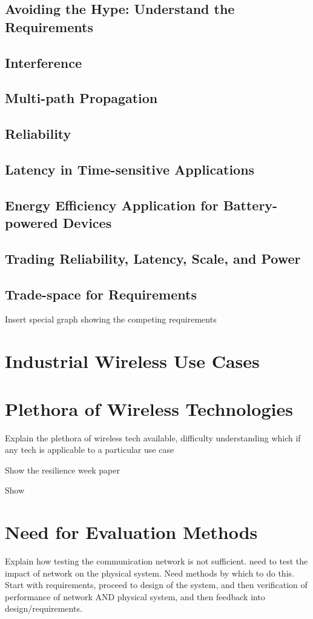 \documentclass[english]{spimubphdthesis}
\begin{document}
\subsection{Avoiding the Hype: Understand the Requirements}
\subsection{Interference}
\subsection{Multi-path Propagation}
\subsection{Reliability}
\subsection{Latency in Time-sensitive Applications}
\subsection{Energy Efficiency Application for Battery-powered Devices }
\subsection{Trading Reliability, Latency, Scale, and Power}

\subsection{Trade-space for Requirements}
Insert special graph showing the competing requirements

\section{Industrial Wireless Use Cases}

\section{Plethora of Wireless Technologies}
Explain the plethora of wireless tech available, difficulty understanding which if any tech is applicable to a particular use case

Show the resilience week paper

Show 

\section{Need for Evaluation Methods }
Explain how testing the communication network is not sufficient.  need to test the impact of network on the physical system.  Need methods by which to do this.  Start with requirements, proceed to design of the system, and then verification of performance of network AND physical system, and then feedback into design/requirements.
\end{document}
